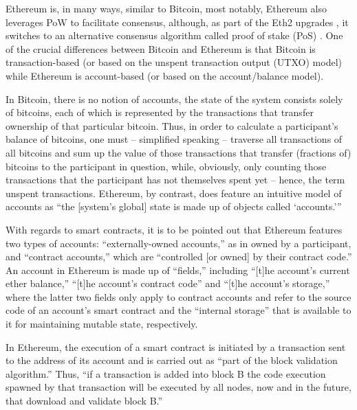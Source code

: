 Ethereum is, in many ways, similar to Bitcoin, most notably, Ethereum also leverages PoW to facilitate consensus, although, as part of the Eth2 upgrades \autocite{ethereum2021eth2}, it switches to an alternative consensus algorithm called proof of stake (PoS) \autocite{ethereum2020pos}.
One of the crucial differences between Bitcoin and Ethereum is that Bitcoin is transaction-based (or based on the unspent transaction output (UTXO) model) while Ethereum is account-based (or based on the account/balance model).

In Bitcoin, there is no notion of accounts, the state of the system consists solely of bitcoins, each of which is represented by the transactions that transfer ownership of that particular bitcoin.
Thus, in order to calculate a participant's balance of bitcoins, one must -- simplified speaking -- traverse all transactions of all bitcoins and sum up the value of those transactions that transfer (fractions of) bitcoins to the participant in question, while, obviously, only counting those transactions that the participant has not themselves spent yet -- hence, the term unspent transactions.
Ethereum, by contrast, does feature an intuitive model of accounts as \enquote{the [system's global] state is made up of objects called \enquote{accounts.}} \autocite[13]{blockchainlab2013ethereumwhitepaper}

With regards to smart contracts, it is to be pointed out that Ethereum features two types of accounts:
``externally-owned accounts,'' as in owned by a participant, and ``contract accounts,'' which are ``controlled [or owned] by their contract code.'' \autocite[13]{blockchainlab2013ethereumwhitepaper}
An account in Ethereum is made up of ``fields,'' including ``[t]he account's current ether balance,'' ``[t]he account's contract code'' and ``[t]he account's storage,'' where the latter two fields only apply to contract accounts and refer to the source code of an account's smart contract and the ``internal storage'' that is available to it for maintaining mutable state, respectively. \autocite[13, 14]{blockchainlab2013ethereumwhitepaper}

In Ethereum, the execution of a smart contract is initiated by a transaction sent to the address of its account and is carried out as ``part of the block validation algorithm.''
Thus, ``if a transaction is added into block B the code execution spawned by that transaction will be executed by all nodes, now and in the future, that download and validate block B.'' \autocite{ethereum2021whitepaper}


